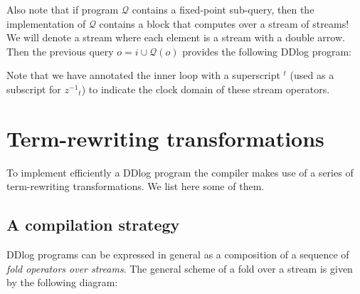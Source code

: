 \documentclass[10pt]{article}
\newcommand{\zm}{\ensuremath{z^{-1}}} %
\newcommand{\I}{\mathcal{I}}  %
\newcommand{\D}{\mathcal{D}}  %
\newcommand{\distinct}{\mathit{distinct}}  %
\newcommand{\q}{\ensuremath{\mathcal{Q}}}  %
\begin{document}
Also note that if program $\q$ contains a fixed-point sub-query, then
the implementation of $\q$ contains a block that computes over a
stream of streams!  We will denote a stream where each element is a
stream with a double arrow.  Then the previous query $o = i \cup
\q(o)$ provides the following DDlog program:


Note that we have annotated the inner loop with a superscript ${}^t$
(used as a subscript for $\zm_t$) to indicate the clock domain of
these stream operators.

\section{Term-rewriting transformations}

To implement efficiently a DDlog program the compiler makes use of a
series of term-rewriting transformations.  We list here some of them.

\subsection{A compilation strategy}

DDlog programs can be expressed in general as a composition of a
sequence of \emph{fold operators over streams}.  The general scheme
of a fold over a stream is given by the following diagram:
\end{document}

